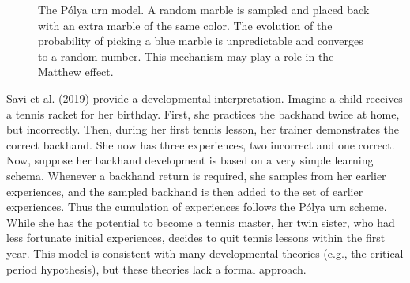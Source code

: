 \documentclass[
  a4paper,
  DIV=11,
  numbers=noendperiod,
  oneside]{scrreprt}
\begin{document}
\begin{figure}


\caption{\label{fig-ch4n-img12-old-60}The Pólya urn model. A random
marble is sampled and placed back with an extra marble of the same
color. The evolution of the probability of picking a blue marble is
unpredictable and converges to a random number. This mechanism may play
a role in the Matthew effect.}

\end{figure}%

Savi et al. (2019) provide a developmental interpretation. Imagine a
child receives a tennis racket for her birthday. First, she practices
the backhand twice at home, but incorrectly. Then, during her first
tennis lesson, her trainer demonstrates the correct backhand. She now
has three experiences, two incorrect and one correct. Now, suppose her
backhand development is based on a very simple learning schema. Whenever
a backhand return is required, she samples from her earlier experiences,
and the sampled backhand is then added to the set of earlier
experiences. Thus the cumulation of experiences follows the Pólya urn
scheme. While she has the potential to become a tennis master, her twin
sister, who had less fortunate initial experiences, decides to quit
tennis lessons within the first year. This model is consistent with many
developmental theories (e.g., the critical period hypothesis), but these
theories lack a formal approach.
\end{document}
